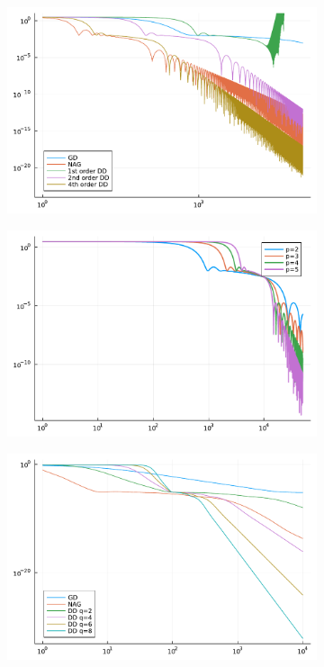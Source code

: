 \begin{figure}[htbp]
    \begin{subfigure}{0.4\textwidth}
        \includegraphics[width=\textwidth]{"assets/quadratic-1.pdf"}
        \caption{}
        \label{fig:l2-1}
    \end{subfigure}
    \hfill
    \begin{subfigure}{0.4\textwidth}
        \includegraphics[width=\textwidth]{"assets/quadratic-2.pdf"}
        \caption{}
        \label{fig:l2-2}
    \end{subfigure}
    \hfill
    \begin{subfigure}{0.4\textwidth}
        \includegraphics[width=\textwidth]{"assets/l4loss.pdf"}

\end{subfigure}
\end{figure}
